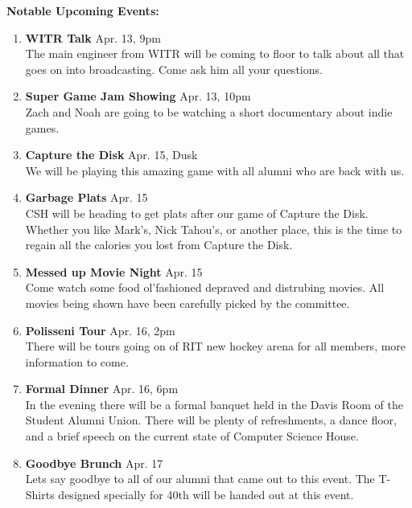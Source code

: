 \documentclass[9pt]{extarticle} %
\begin{document}
\begin{minipage}[t]{.45\linewidth}
\begin{mdframed}[style=sidebar,frametitle={}]
\textbf{Notable Upcoming Events:}
\begin{enumerate}[leftmargin=0.2cm]
\item \textbf{WITR Talk} Apr. 13, 9pm \\
  The main engineer from WITR will be coming to floor to talk about all that
  goes on into broadcasting. Come ask him all your questions.
  \\
\item \textbf{Super Game Jam Showing} Apr. 13, 10pm \\
  Zach and Noah are going to be watching a short documentary about indie
  games.
  \\
\item \textbf{Capture the Disk} Apr. 15, Dusk \\
  We will be playing this amazing game with all alumni who are back with us.
  \\
\item \textbf{Garbage Plats} Apr. 15 \\
  CSH will be heading to get plats after our game of Capture the Disk. Whether
  you like Mark's, Nick Tahou's, or another place, this is the time to regain
  all the calories you lost from Capture the Disk.
  \\
\item \textbf{Messed up Movie Night} Apr. 15 \\
  Come watch some food ol'fashioned depraved and distrubing movies. All movies
  being shown have been carefully picked by the committee.
  \\
\item \textbf{Polisseni Tour} Apr. 16, 2pm \\
  There will be tours going on of RIT new hockey arena for all members, more
  information to come.
  \\
\item \textbf{Formal Dinner} Apr. 16, 6pm \\
  In the evening there will be a formal banquet held in the Davis Room of the
  Student Alumni Union. There will be plenty of refreshments, a dance floor,
  and a brief speech on the current state of Computer Science House.
  \\
\item \textbf{Goodbye Brunch} Apr. 17 \\
  Lets say goodbye to all of our alumni that came out to this event. The
  T-Shirts designed specially for 40th will be handed out at this event.
  \\
\end{enumerate}


\end{mdframed}
\end{minipage}
\end{document}
